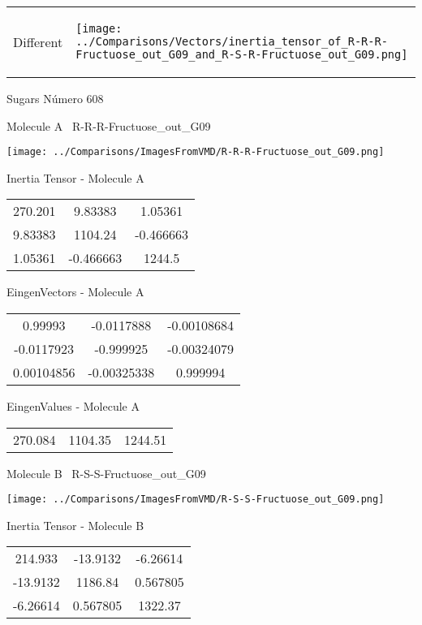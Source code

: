 \vtab[-5mm]
\begin{tabular}{*{2}{m{}}}
\begin{center}
\textcolor{NavyBlue}{\Large Different}
\end{center}
&
\begin{center}
\texttt{[image: ../Comparisons/Vectors/inertia\_tensor\_of\_R-R-R-Fructuose\_out\_G09\_and\_R-S-R-Fructuose\_out\_G09.png]}
\end{center}
\end{tabular}

 \newpage

\vtab[-3cm]
\begin{center}
{\large Sugars \tab Número 608}
\end{center}
\begin{multicols}{2}
\begin{center}

Molecule A \
R-R-R-Fructuose\_out\_G09

\texttt{[image: ../Comparisons/ImagesFromVMD/R-R-R-Fructuose\_out\_G09.png]}

Inertia Tensor - Molecule A \\
\begin{tabular}{|c c c|}
270.201	 & 	9.83383	 & 	1.05361	 \\
9.83383	 & 	1104.24	 & 	-0.466663	 \\
1.05361	 & 	-0.466663	 & 	1244.5
\end{tabular}

\vtab
 EingenVectors - Molecule A     \\
\begin{tabular}{|c c c|}
0.99993	 & 	-0.0117888	 & 	-0.00108684	 \\
-0.0117923	 & 	-0.999925	 & 	-0.00324079	 \\
0.00104856	 & 	-0.00325338	 & 	0.999994
\end{tabular}

\vtab
 EingenValues - Molecule A     \\
\begin{tabular}{|c c c|}
270.084	 & 	1104.35	 & 	1244.51	 \\
\end{tabular}
\columnbreak

Molecule B \
R-S-S-Fructuose\_out\_G09

\texttt{[image: ../Comparisons/ImagesFromVMD/R-S-S-Fructuose\_out\_G09.png]}

Inertia Tensor - Molecule B \\
\begin{tabular}{|c c c|}
214.933	 & 	-13.9132	 & 	-6.26614	 \\
-13.9132	 & 	1186.84	 & 	0.567805	 \\
-6.26614	 & 	0.567805	 & 	1322.37
\end{tabular}


\end{center}
\end{multicols}
